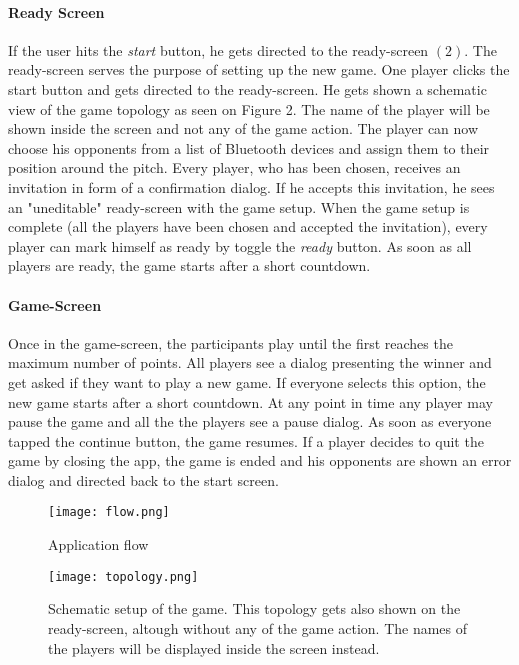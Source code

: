 \documentclass{report}
\newcommand{\lfig}[1]{\label{fig:#1}}
\begin{document}
\paragraph{Ready Screen}
If the user hits the \textit{start} button, he gets directed to the ready-screen $(2)$. The ready-screen serves the purpose of setting up the new game. One player clicks the start button and gets directed to the ready-screen. He gets shown a schematic view of the game topology as seen on Figure 2. The name of the player will be shown inside the screen and not any of the game action. The player can now choose his opponents from a list of Bluetooth devices and assign them to their position around the pitch. Every player, who has been chosen, receives an invitation in form of a confirmation dialog. If he accepts this invitation, he sees an "uneditable" ready-screen with the game setup. When the game setup is complete (all the players have been chosen and accepted the invitation), every player can mark himself as ready by toggle the \textit{ready} button. As soon as all players are ready, the game starts after a short countdown.

\paragraph{Game-Screen}
Once in the game-screen, the participants play until the first reaches the maximum number of points. All players see a dialog presenting the winner and get asked if they want to play a new game. If everyone selects this option, the new game starts after a short countdown. At any point in time any player may pause the game and all the the players see a pause dialog. As soon as everyone tapped the continue button, the game resumes. If a player decides to quit the game by closing the app, the game is ended and his opponents are shown an error dialog and directed back to the start screen.

\begin{figure}[h]
	\centering
    \texttt{[image: flow.png]}
    \lfig{example}
    \vspace{-5mm} %
	\caption{Application flow}
\end{figure}

\begin{figure}[h]
	\centering
    \texttt{[image: topology.png]}
    \lfig{system-overview}
    \vspace{-5mm} %
	\caption{Schematic setup of the game. This topology gets also shown on the ready-screen, altough without any of the game action. The names of the players will be displayed inside the screen instead.}
\end{figure}
\end{document}
